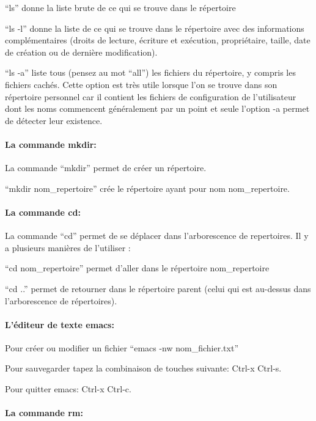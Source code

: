 \documentclass{article}
\begin{document}
``ls'' donne la liste brute de ce qui se trouve dans le répertoire

``ls -l'' donne la liste de ce qui se trouve dans le répertoire avec des
informations complémentaires (droits de lecture, écriture et exécution,
propriétaire, taille, date de création ou de dernière modification).

``ls -a'' liste tous (pensez au mot ``all'') les fichiers du répertoire,
y compris les fichiers cachés. Cette option est très utile lorsque l'on
se trouve dans son répertoire personnel car il contient les fichiers de
configuration de l'utilisateur dont les noms commencent généralement par
un point et seule l'option -a permet de détecter leur existence.

    \paragraph{La commande mkdir:}\label{la-commande-mkdir}

    La commande ``mkdir'' permet de créer un répertoire.

``mkdir nom\_repertoire'' crée le répertoire ayant pour nom
nom\_repertoire.

    \paragraph{La commande cd:}\label{la-commande-cd}

    La commande ``cd'' permet de se déplacer dans l'arborescence de
repertoires. Il y a plusieurs manières de l'utiliser :

``cd nom\_repertoire'' permet d'aller dans le répertoire nom\_repertoire

``cd ..'' permet de retourner dans le répertoire parent (celui qui est
au-dessus dans l'arborescence de répertoires).

    \paragraph{L'éditeur de texte emacs:}\label{luxe9diteur-de-texte-emacs}

    Pour créer ou modifier un fichier ``emacs -nw nom\_fichier.txt''

Pour sauvegarder tapez la combinaison de touches suivante: Ctrl-x
Ctrl-s.

Pour quitter emacs: Ctrl-x Ctrl-c.

    \paragraph{La commande rm:}\label{la-commande-rm}
\end{document}
